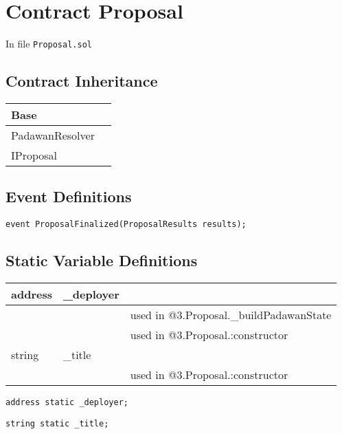 
\chapter{Contract Proposal}

\minitoc

In file {\tt Proposal.sol}

\section{Contract Inheritance}


\noindent\begin{tabular}{|l|p{5cm}|}\hline
Base & \\\hline
PadawanResolver & \\\hline
IProposal & \\\hline
\end{tabular}


\section{Event Definitions}


\begin{lstlisting}[firstnumber=23]
    event ProposalFinalized(ProposalResults results);
\end{lstlisting}

\section{Static Variable Definitions}


\ifsoltables
\noindent\begin{tabular}{|l|l|p{5cm}|}\hline
address & \_{}deployer &  \\\hline
 & & used in @3.Proposal.\_{}buildPadawanState\\\hline
 & & used in @3.Proposal.:constructor\\\hline
string & \_{}title &  \\\hline
 & & used in @3.Proposal.:constructor\\\hline
\end{tabular}
\fi


\begin{lstlisting}[firstnumber=13]
    address static _deployer;
\end{lstlisting}

\begin{lstlisting}[firstnumber=14]
    string static _title;
\end{lstlisting}

